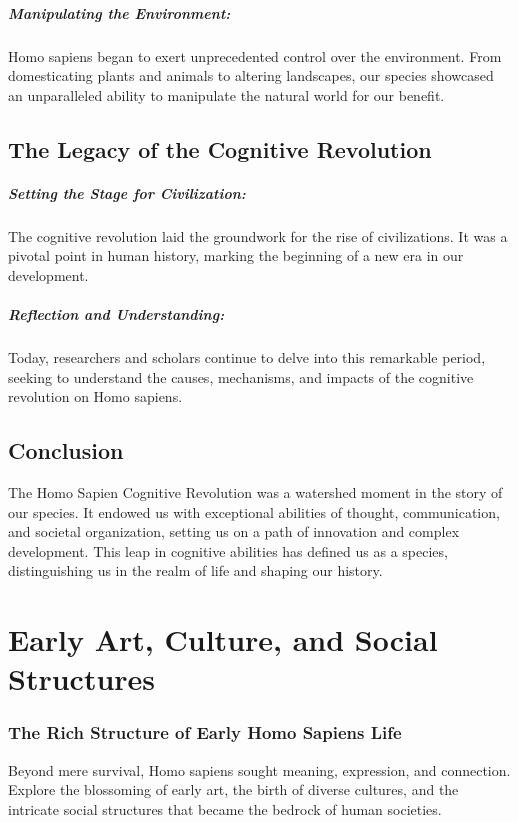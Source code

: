 \documentclass[a4paper,12pt]{book}
\begin{document}
\paragraph{Manipulating the Environment:}
Homo sapiens began to exert unprecedented control over the environment. From domesticating plants and animals to altering landscapes, our species showcased an unparalleled ability to manipulate the natural world for our benefit.

\section*{The Legacy of the Cognitive Revolution}

\paragraph{Setting the Stage for Civilization:}
The cognitive revolution laid the groundwork for the rise of civilizations. It was a pivotal point in human history, marking the beginning of a new era in our development.

\paragraph{Reflection and Understanding:}
Today, researchers and scholars continue to delve into this remarkable period, seeking to understand the causes, mechanisms, and impacts of the cognitive revolution on Homo sapiens.

\section*{Conclusion}

The Homo Sapien Cognitive Revolution was a watershed moment in the story of our species. It endowed us with exceptional abilities of thought, communication, and societal organization, setting us on a path of innovation and complex development. This leap in cognitive abilities has defined us as a species, distinguishing us in the realm of life and shaping our history.

\chapter{Early Art, Culture, and Social Structures}
\subsection*{The Rich Structure of Early Homo Sapiens Life}
Beyond mere survival, Homo sapiens sought meaning, expression, and connection. Explore the blossoming of early art, the birth of diverse cultures, and the intricate social structures that became the bedrock of human societies.
\end{document}
